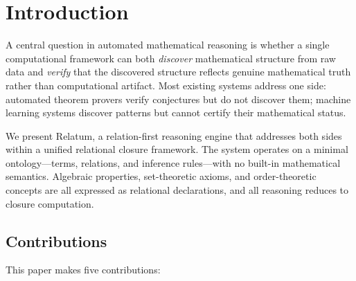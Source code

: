 \section{Introduction}
\label{sec:introduction}

A central question in automated mathematical reasoning is whether a single computational framework can both \emph{discover} mathematical structure from raw data and \emph{verify} that the discovered structure reflects genuine mathematical truth rather than computational artifact. Most existing systems address one side: automated theorem provers verify conjectures but do not discover them; machine learning systems discover patterns but cannot certify their mathematical status.

We present Relatum, a relation-first reasoning engine that addresses both sides within a unified relational closure framework. The system operates on a minimal ontology---terms, relations, and inference rules---with no built-in mathematical semantics. Algebraic properties, set-theoretic axioms, and order-theoretic concepts are all expressed as relational declarations, and all reasoning reduces to closure computation.

\subsection{Contributions}

This paper makes five contributions:

